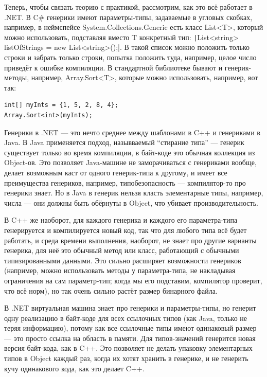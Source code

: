 \documentclass[a5paper]{article}
\begin{document}
Теперь, чтобы связать теорию с практикой, рассмотрим, как это всё работает в .NET. В C\# генерики имеют параметры-типы, задаваемые в угловых скобках, например, в неймспейсе System.Collections.Generic есть класс List<T>, который можно использовать, подставляя вместо T конкретный тип: \texttt|List<string> listOfStrings = new List<string>();|. В такой список можно положить только строки и забрать только строки, попытка положить туда, например, целое число приведёт к ошибке компиляции. В стандартной библиотеке бывают и генерик-методы, например, Array.Sort<T>, которые можно использовать, например, вот так:

\begin{verbatim}
int[] myInts = {1, 5, 2, 8, 4};
Array.Sort<int>(myInts);
\end{verbatim}

Генерики в .NET --- это нечто среднее между шаблонами в C++ и генериками в Java. В Java применяется подход, назывваемый ``стирание типа'' --- генерик существует только во время компиляции, в байт-коде это обычная коллекция из Object-ов. Это позволяет Java-машине не заморачиваться с генериками вообще, делает возможным каст от одного генерик-типа к другому, и имеет все преимущества генериков, например, типобезопасность --- компилятор-то про генерики знает. Но в Java в генерик нельзя класть элементарные типы, например, числа --- они должны быть обёрнуты в Object, что убивает производительность.

В C++ же наоборот, для каждого генерика и каждого его параметра-типа генерируется и компилируется новый код, так что для любого типа всё будет работать, и среда времени выполнения, наоборот, не знает про другие варианты генерика, для неё это обычный метод или класс, работающий с обычными типизированными данными. Это сильно расширяет возможности генериков (например, можно использовать методы у параметра-типа, не накладывая ограничения на сам параметр-тип; когда мы его подставим, компилятор проверит, что всё норм), но так очень сильно растёт размер бинарного файла.

В .NET виртуальная машина знает про генерики и параметры-типы, но генерит одну реализацию в байт-коде для всех ссылочных типов (как Java, только не теряя информацию), потому как все ссылочные типы имеют одинаковый размер --- это просто ссылка на область в памяти. Для типов-значений генерится новая версия байт-кода, как в C++. Это позволяет не делать упаковку элементарных типов в Object каждый раз, когда их хотят хранить в генерике, и не генерить кучу одинакового кода, как это делает C++.
\end{document}
